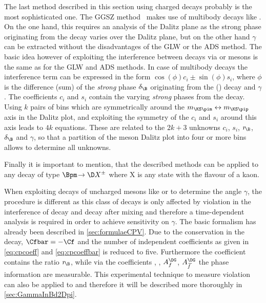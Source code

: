 The last method described in this section using charged \B decays probably is the most sophisticated one.
The GGSZ method~\cite{Giri:2003ty} makes use of multibody \D decays like \KS\pip\pim.
On the one hand, this requires an analysis of the Dalitz plane as the strong phase originating from the \D decay varies over the Dalitz plane, but on the other hand $\gamma$ can be extracted without the disadvantages of the GLW or the ADS method.
The basic idea however of exploiting the interference between \Bp decays via \Dz or \Dzb mesons is the same as for the GLW and ADS methods.
In case of multibody \D decays the interference term can be expressed in the form $\cos\!\left(\phi\right)c_i\pm\sin\!\left(\phi\right)s_i$, where $\phi$ is the difference (sum) of the \emph{strong} phase $\delta_\B$ originating from the \Bm (\Bp) decay and $\gamma$.
The coefficients $c_i$ and $s_i$ contain the varying \emph{strong} phases from the \D decay.
Using $k$ pairs of bins which are symmetrically around the $m_{\KS\pim}\leftrightarrow m_{\KS\pip}$ axis in the Dalitz plot, and exploiting the symmetry of the $c_i$ and $s_i$ around this axis leads to $4k$ equations.
These are related to the $2k+3$ unknowns $c_i$, $s_i$, $r_{\kern -1.0pt \B}$, $\delta_\B$ and $\gamma$, so that a partition of the \D meson Dalitz plot into four or more bins allows to determine all unknowns.

Finally it is important to mention, that the described methods can be applied to any decay of type $\Bpm\!\to\D X^{\pm}$ where X is any state with the flavour of a kaon.

When exploiting decays of uncharged \B mesons like \mbox{\BsToDsK} or \mbox{\BdToDpi} to determine the angle $\gamma$, the procedure is different as this class of decays is only affected by \CP violation in the interference of decay and decay after mixing and therefore a time-dependent analysis is required in order to achieve sensitivity on $\gamma$.
The basic formalism has already been described in \cref{sec:formulaeCPV}.
Due to the \CP conservation in the decay, $\Cfbar=-\Cf$ and the number of independent coefficients as given in \cref{eq:cpcoeff} and \cref{eq:cpcoeffbar} is reduced to five.
Furthermore the \CP coefficient \Cf contains the ratio $r_{\kern -1.0pt \B}$, while via the coefficients \Sf, \Sfbar, $A_f^{\DG}$, $A_{\kern 1.5pt\overline{\kern -1.5pt f\kern 1.5pt}}^{\DG}$ the phase information are measurable.
This experimental technique to measure \CP violation can also be applied to \BdToDpi and therefore it will be described more thoroughly in \cref{sec:GammaInBd2Dpi}.

